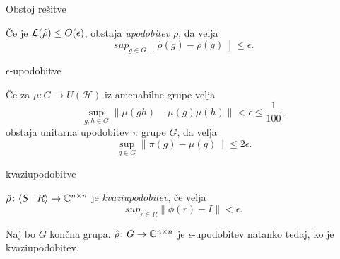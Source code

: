 \begin{frame}{\color{aoblue}Obstoj rešitve}
  \begin{izrek}
    Če je $\mathcal L(\hat \rho) \leq O(\epsilon)$, obstaja
    \emph{upodobitev} $\rho$, da velja
    $$
    sup_{g \in G} \left\|
    \hat \rho(g) - \rho(g)
    \right\| \leq \epsilon.
    $$
  \end{izrek}
\end{frame}
\begin{frame}{$\epsilon$-upodobitve}
  \begin{izrek}[Kazhdan]
    Če za $\mu \colon G \to U(\mathcal H)$ iz amenabilne grupe velja
    $$
    \sup_{g,h \in G} \|\mu(gh) - \mu(g)\mu(h)\| < \epsilon \leq \frac{1}{100},
    $$
    obstaja unitarna upodobitev $\pi$ grupe $G$, da velja
    $$
    \sup_{g \in G} \|\pi(g) - \mu(g) \| \leq 2\epsilon.
    $$
  \end{izrek}
\end{frame}
\begin{frame}{kvaziupodobitve}
  \begin{definicija}
    $\hat \rho \colon \langle S \mid R \rangle \to \mathbb C^{n \times n}$ je
    \emph{kvaziupodobitev}, če velja
    $$
    sup_{r \in R} \left\| \phi(r) - I  \right\| < \epsilon.
    $$
  \end{definicija}
  \begin{izrek}
    Naj bo $G$ končna grupa. $\hat \rho \colon G \to \mathbb C^{n \times n}$
    je  $\epsilon$-upodobitev natanko tedaj, ko je kvaziupodobitev.
  \end{izrek}
\end{frame}